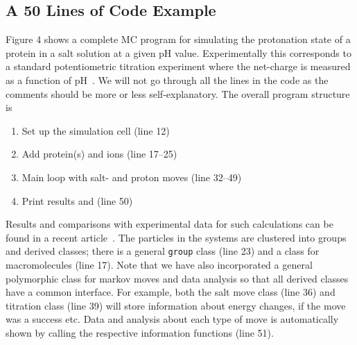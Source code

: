 \documentclass[10pt]{bmc_article}
\newenvironment{bmcformat}{\begin{raggedright}\baselineskip20pt\sloppy\setboolean{publ}{false}}{\end{raggedright}\baselineskip20pt\sloppy}
\begin{document}
\begin{bmcformat}


\subsection*{A 50 Lines of Code Example}
Figure 4 shows a complete MC program for simulating the protonation state of a protein in a salt solution at a given pH value.
Experimentally this corresponds to a standard potentiometric titration experiment where the net-charge is measured as a function of pH~\cite{tanford:72}.
We will not go through all the lines in the code as the comments should be more or less self-explanatory.
The overall program structure is
\begin{enumerate}
\item Set up the simulation cell (line 12)
\item Add protein(s) and ions (line 17--25)
\item Main loop with salt- and proton moves (line 32--49)
\item Print results and (line 50)
\end{enumerate}
Results and comparisons with experimental data for such calculations can be found in a recent article~\cite{lund:07}.
The particles in the systems are clustered into groups and derived classes; there is a general \verb"group" class (line 23) and a class for macromolecules (line 17).
Note that we have also incorporated a general polymorphic class for markov moves and data analysis so that all derived classes have a common interface.
For example, both the salt move class (line 36) and titration class (line 39) will store information about energy changes, if the move was a success etc.
Data and analysis about each type of move is automatically shown by calling the respective information functions (line 51).



\end{bmcformat}
\end{document}
